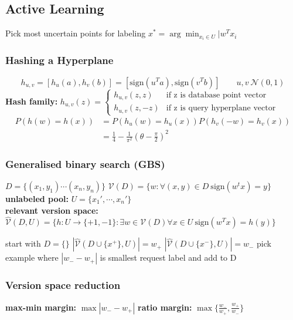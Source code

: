 \documentclass[10pt,parskip]{scrartcl}
\begin{document}
\begin{multicols*}{3}
\subsection{Active Learning} %
\label{sub:active_learning}
Pick most uncertain points for labeling 
$x^{\ast} = \arg\min_{x_i\in U}|w^Tx_i$ \\
\subsubsection{Hashing a Hyperplane} %
\label{ssub:hashing_a_hyperplane}
$$
h_{u,v} = [h_u(a),h_v(b)] = [\mathrm{sign}(u^Ta),\mathrm{sign}(v^Tb)] \qquad u,v ~ \mathcal{N}(0,1)
$$
\textbf{Hash family: } $h_{u,v}(z) = \begin{cases}
	h_{u,v}(z,z) & \text{if z is database point vector} \\
	h_{u,v}(z,-z) & \text{if z is query hyperplane vector}
\end{cases}$ \\
\begin{align}
P(h(w)=h(x)) &= P(h_u(w)=h_u(x))P(h_v(-w)=h_v(x)) \\
&= \frac{1}{4} - \frac{1}{\pi^2}(\theta-\frac{\pi}{2})^2
\end{align}
\subsubsection{Generalised binary search (GBS)} %
\label{ssub:gbs}
$D = \{(x_1,y_1) \cdots (x_n,y_n) \}$ \qquad 
$\mathcal{V}(D) = \{w: \forall(x,y) \in D \ \mathrm{sign}(w^tx) = y \}$ \\
\textbf{unlabeled pool: } $U = \{x_1',\cdots,x_n'\}$ \\
\textbf{relevant version space: } $\hat{\mathcal{V}}(D,U) = \{h:U \to \{+1,-1\} : \exists w \in \mathcal{V}(D) \forall x\in U \ \mathrm{sign}(w^Tx) = h(y) \}$
\begin{mdframed}
	\begin{algorithmic}
		\State start with $D=\{\}$
				\State $|\hat{\mathcal{V}}(D\cup \{x^+\},U)| = w_+$
				\State $|\hat{\mathcal{V}}(D\cup \{x^-\},U)| = w_-$
			\EndFor
			\State pick example where $|w_- - w_+|$ is smallest
			\State request label and add to D
		\EndWhile
	\end{algorithmic}
\end{mdframed}
\subsubsection{Version space reduction} %
\label{ssub:version_space_reduction}
\textbf{max-min margin: } $\max |w_- - w_+|$ \quad \textbf{ratio margin: } $\max \{\frac{w_-}{w_+},\frac{w_+}{w_-} \}$

\end{multicols*}
\end{document}
